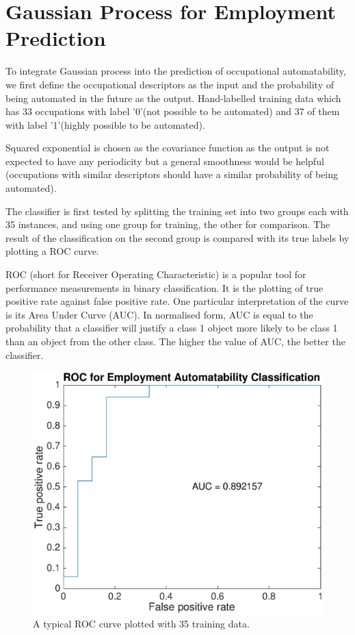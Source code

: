 \documentclass[14pt]{report}
\numberwithin{equation}{chapter}
\begin{document}
\begin{spacing}{2}
\begin{figure}
\end{figure}

\chapter{Gaussian Process for Employment Prediction}
To integrate Gaussian process into the prediction of occupational automatability, we first define the occupational descriptors as the input and the probability of being automated in the future as the output. Hand-labelled training data\cite{frey2013future} which has 33 occupations with label '0'(not possible to be automated) and 37 of them with label '1'(highly possible to be automated). 

Squared exponential is chosen as the covariance function as the output is not expected to have any periodicity but a general smoothness would be helpful (occupations with similar descriptors should have a similar probability of being automated). 







The classifier is first tested by splitting the training set into two groups each with 35 instances, and using one group for training, the other for comparison. The result of the classification on the second group is compared with its true labels by plotting a ROC curve. 

ROC (short for Receiver Operating Characteristic) is a popular tool for performance measurements in binary classification. It is the plotting of true positive rate against false positive rate. One particular interpretation of the curve is its Area Under Curve (AUC). In normalised form, AUC is equal to the probability that a classifier will justify a class 1 object more likely to be class 1 than an object from the other class. The higher the value of AUC, the better the classifier.

\begin{figure}
\centering
\includegraphics[scale=0.5]{ROC1.eps}
\caption{A typical ROC curve plotted with 35 training data. }
\end{figure}




\end{spacing}
\end{document}
